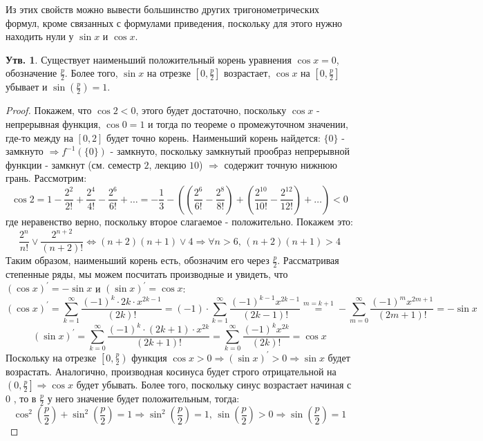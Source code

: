 \documentclass[12pt]{article}
\theoremstyle{definition}
\newtheorem{prop}{Утв.}
\newcommand{\ddsum}[2]{\displaystyle\sum\limits_{#1}^{#2}}
\begin{document}
Из этих свойств можно вывести большинство других тригонометрических формул, кроме связанных с формулами приведения, поскольку для этого нужно находить нули у $\sin{x}$ и $\cos{x}$.
\begin{prop}
	Существует наименьший положительный корень уравнения $\cos{x} = 0$, обозначение $\tfrac{p}{2}$. Более того, $\sin{x}$ на отрезке $\left[0,\tfrac{p}{2}\right]$ возрастает, $\cos{x}$ на $\left[0,\tfrac{p}{2}\right]$ убывает и $\sin{\left(\tfrac{p}{2}\right)} = 1$.
\end{prop}
\begin{proof}
	Покажем, что $\cos{2} < 0$, этого будет достаточно, поскольку $\cos{x}$ - непрерывная функция, $\cos{0} = 1$ и тогда по теореме о промежуточном значении, где-то между на $[0,2]$ будет точно корень. Наименьший корень найдется: $\{0\}$ - замкнуто $\Rightarrow f^{-1}\left(\{0\}\right)$ - замкнуто, поскольку замкнутый прообраз непрерывной функции - замкнут (см. семестр $2$, лекцию $10$) $\Rightarrow$ содержит точную нижнюю грань. Рассмотрим:
	$$
		\cos{2} = 1 - \dfrac{2^2}{2!} + \dfrac{2^4}{4!} - \dfrac{2^6}{6!} + \dotsc = -\dfrac{1}{3} - \left(\left(\dfrac{2^6}{6!} - \dfrac{2^8}{8!}\right)  + \left(\dfrac{2^{10}}{10!} - \dfrac{2^{12}}{12!}\right) + \dotsc \right) < 0
	$$
	где неравенство верно, поскольку второе слагаемое - положительно. Покажем это:
	$$
		\dfrac{2^n}{n!} \vee \dfrac{2^{n+2}}{(n+2)!} \Leftrightarrow (n+2)(n+1) \vee  4 \Rightarrow \forall n > 6, \, (n+2)(n+1) > 4
	$$
	Таким образом, наименьший корень есть, обозначим его через $\frac{p}{2}$. Рассматривая степенные ряды, мы можем посчитать производные и увидеть, что $(\cos{x})^\prime = -\sin{x}$ и $(\sin{x})^\prime = \cos{x}$:
	$$
		(\cos{x})^\prime = \ddsum{k = 1}{\infty} \dfrac{(-1)^k{\cdot} 2k{\cdot} x^{2k - 1}}{(2k)!} = (-1){\cdot}\ddsum{k = 1}{\infty} \dfrac{(-1)^{k-1} x^{2k - 1}}{(2k -1 )!} \overset{m = k + 1}{=} - \ddsum{m = 0}{\infty}\dfrac{(-1)^{m} x^{2m + 1}}{(2m + 1)!} = - \sin{x}
	$$
	$$
		(\sin{x})^\prime = \ddsum{k = 0}{\infty} \dfrac{(-1)^k {\cdot}(2k+1){\cdot}x^{2k}}{(2k+1)!} = \ddsum{ k = 0}{\infty}\dfrac{(-1)^k x^{2k}}{(2k)!} = \cos{x}
	$$
	Поскольку на отрезке $\left[0,\frac{p}{2}\right)$ функция $\cos{x} > 0 \Rightarrow (\sin{x})^\prime > 0 \Rightarrow \sin{x}$ будет возрастать. Аналогично, производная косинуса будет строго отрицательной на $\left(0, \frac{p}{2}\right] \Rightarrow \cos{x}$ будет убывать. Более того, поскольку синус возрастает начиная с $0$ , то в $\frac{p}{2}$ у него значение будет положительным, тогда:
	$$
		\cos^2{\left(\frac{p}{2}\right)} + \sin^2{\left(\frac{p}{2}\right)} = 1 \Rightarrow \sin^2{\left(\frac{p}{2}\right)} = 1, \,  \sin{\left(\frac{p}{2}\right)} > 0 \Rightarrow \sin{\left(\frac{p}{2}\right)} = 1
	$$
\end{proof}
\end{document}
